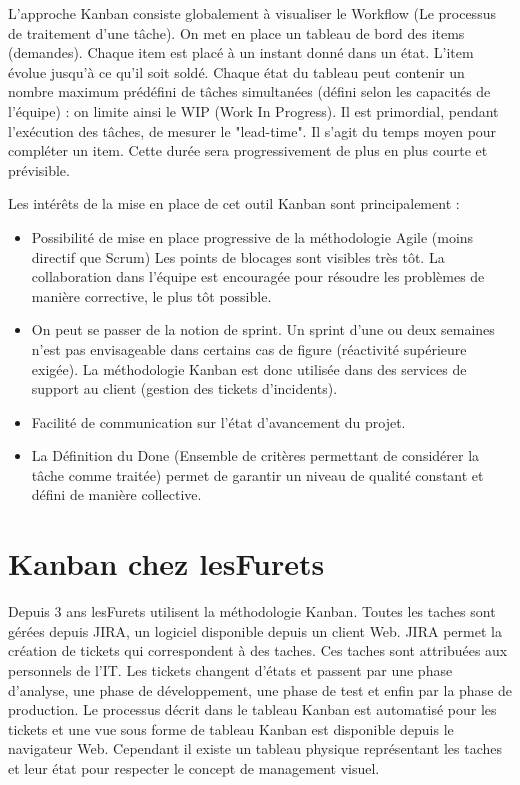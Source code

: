 L'approche Kanban consiste globalement à visualiser le Workflow (Le processus de traitement d'une tâche). On met en place un tableau de bord des items (demandes). Chaque item est placé à un instant donné dans un état. L'item évolue jusqu'à ce qu'il soit soldé. Chaque état du tableau peut contenir un nombre maximum prédéfini de tâches simultanées (défini selon les capacités de l'équipe) : on limite ainsi le WIP (Work In Progress). Il est primordial, pendant l'exécution des tâches, de mesurer le "lead-time". Il s'agit du temps moyen pour compléter un item. Cette durée sera progressivement de plus en plus courte et prévisible.

Les intérêts de la mise en place de cet outil Kanban sont principalement :
\begin{itemize}
\item 
Possibilité de mise en place progressive de la méthodologie Agile (moins directif que Scrum)
Les points de blocages sont visibles très tôt. La collaboration dans l'équipe est encouragée pour résoudre les problèmes de manière corrective, le plus tôt possible.
\item
On peut se passer de la notion de sprint. Un sprint d'une ou deux semaines n'est pas envisageable dans certains cas de figure (réactivité supérieure exigée). La méthodologie Kanban est donc utilisée dans des services de support au client (gestion des tickets d'incidents).
\item
Facilité de communication sur l'état d'avancement du projet.
\item 
La Définition du Done (Ensemble de critères permettant de considérer la tâche comme traitée) permet de garantir un niveau de qualité constant et défini de manière collective.
\end{itemize}

\section{Kanban chez lesFurets}
Depuis 3 ans lesFurets utilisent la méthodologie Kanban.
Toutes les taches sont gérées depuis JIRA, un logiciel disponible depuis un client Web. JIRA permet la création de tickets qui correspondent à des taches. Ces taches sont attribuées aux personnels de l'IT. Les tickets changent d'états et passent par une phase d'analyse, une phase de développement, une phase de test et enfin par la phase de production. Le processus décrit dans le tableau Kanban est automatisé pour les tickets et une vue sous forme de tableau Kanban est disponible depuis le navigateur Web. Cependant il existe un tableau physique représentant les taches et leur état pour respecter le concept de management visuel.

